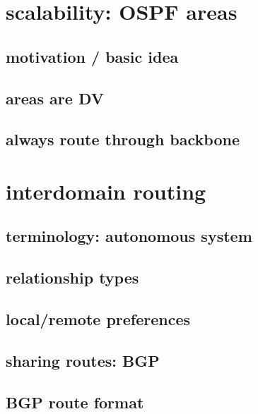 \section{scalability: OSPF areas} %

\subsection{motivation / basic idea}



\subsection{areas are DV}



\subsection{always route through backbone}


\section{interdomain routing}


\subsection{terminology: autonomous system}


\subsection{relationship types}


\subsection{local/remote preferences}


\subsection{sharing routes: BGP}


\subsection{BGP route format}


